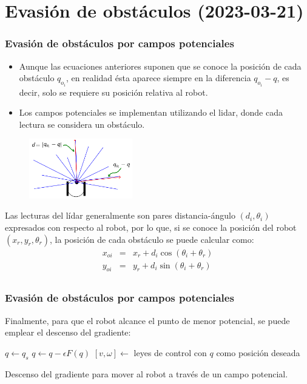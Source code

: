 \section{Evasión de obstáculos (2023-03-21)}

\begin{frame}\frametitle{Evasión de obstáculos por campos potenciales}
  \begin{itemize}
  \item Aunque las ecuaciones anteriores suponen que se conoce la posición de cada obstáculo $q_{o_i}$, en realidad ésta aparece siempre en la diferencia $q_{o_i} - q$, es decir, solo se requiere su posición relativa al robot.
  \item Los campos potenciales se implementan utilizando el lidar, donde cada lectura se considera un obstáculo. 
  \end{itemize}
  \begin{figure}
    \centering
    \includegraphics[width=0.4\textwidth]{Figures/PotFieldsLidar.png}
  \end{figure}
  Las lecturas del lídar generalmente son pares distancia-ángulo $(d_i,\theta_i)$ expresados con respecto al robot, por lo que, si se conoce la posición del robot $(x_r,y_r,\theta_r)$, la posición de cada obstáculo se puede calcular como:
  \begin{eqnarray*}
    x_{oi} &=& x_r + d_i\cos(\theta_i + \theta_r)\\
    y_{oi} &=& y_r + d_i\sin(\theta_i + \theta_r)\\
  \end{eqnarray*}
\end{frame}

\begin{frame}\frametitle{Evasión de obstáculos por campos potenciales}
  Finalmente, para que el robot alcance el punto de menor potencial, se puede emplear el descenso del gradiente:
  \[\]
  \begin{algorithm}[H]
  \DontPrintSemicolon
  \;
$q \leftarrow q_s$\;
{
  $q \leftarrow q - \epsilon F(q)$\;
  $[v,\omega] \leftarrow $ leyes de control con $q$ como posición deseada\;
}
  \caption{Descenso del gradiente para mover al robot a través de un campo potencial.}
  \label{alg:PotFields}
\end{algorithm}
\end{frame}

